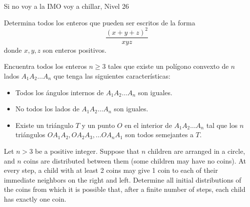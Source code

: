 \documentclass[12pt]{article}
\begin{document}
\begin{examen}{Si no voy a la IMO voy a chillar, Nivel 26}{}
\begin{problema}
    Determina todos los enteros que pueden ser escritos de la forma 
    \[ \frac{(x+y+z)^2}{xyz}\]
    donde $x,y,z$ son enteros positivos.
\end{problema}

\begin{problema}
    
    Encuentra todos los enteros $n\geq 3$ tales que existe un polígono convexto de $n$ lados $A_1A_2\dots A_n$ que tenga las siguientes características:
 \begin{itemize} 
 \item  Todos los ángulos internos de $A_1A_2\dots A_n$ son iguales. 
 \item  No todos los lados de $A_1A_2\dots A_n$ son iguales.
 \item  Existe un triángulo $T$ y un punto $O$ en el interior de $A_1A_2\dots A_n$ tal que los $n$ triángulos $OA_1A_2, OA_2A_3,\dots OA_nA_1$ son todos semejantes a $T$.
 \end{itemize} 
    
\end{problema}

\begin{problema}
Let $n > 3$ be a positive integer. Suppose that $n$ children are arranged in a circle, and $n$ coins are distributed between them (some children may have no coins). At every step, a child with at least 2 coins may give 1 coin to each of their immediate neighbors on the right and left. Determine all initial distributions of the coins from which it is possible that, after a finite number of steps, each child has exactly one coin.
\end{problema}
\end{examen}
\end{document}
